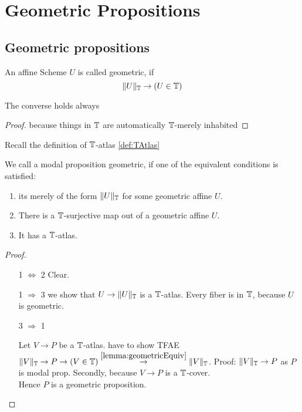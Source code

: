 \section{Geometric Propositions}
\subsection{Geometric propositions}
\begin{definition}
	An affine Scheme $U$ is called geometric, if 
	\[\|U\|_{\mathbb{T}} \to (U \in \mathbb{T})\]	
\end{definition}
\begin{lemma}{\label{lemma:geometricEquiv}}
	The converse holds always
\end{lemma}
\begin{proof}
	because things in $\mathbb{T}$ are automatically $\mathbb{T}$-merely inhabited
\end{proof}
Recall the definition of $\mathbb{T}$-atlas \ref{def:TAtlas}
\begin{definition}{\label{def:algprop}}
	We call a modal proposition geometric, if one of the equivalent conditions is satisfied:
	\begin{enumerate}
		\item  its merely of the form $\|U\|_{\mathbb{T}}$ for some geometric affine $U$.
		\item There is a $\mathbb{T}$-surjective map out of a geometric affine $U$.
		\item It has a $\mathbb{T}$-atlas.
	\end{enumerate}
	
\end{definition}
\begin{proof} \
	\begin{enumerate}
		\item [1 $\Leftrightarrow$ 2]
		Clear.
		\item [1 $\Rightarrow$ 3]
		we show that $U \to \|U\|_{\mathbb{T}}$ is a $\mathbb{T}$-atlas. Every fiber is in $\mathbb{T}$, because $U$ is geometric.
		\item [3 $\Rightarrow$ 1]
		
		Let $V \to P$ be a $\mathbb{T}$-atlas.
		have to show TFAE $\|V\|_{\mathbb{T}} \to P \to (V \in \mathbb{T}) \overset{\ref{lemma:geometricEquiv}}{\to} \|V\|_{\mathbb{T}}$. 
		Proof: $\|V\|_{\mathbb{T}} \to P$ as $P$ is modal prop. Secondly, because $V \to P$ is a $\mathbb{T}$-cover. \\
		Hence $P$ is a geometric proposition.	
	\end{enumerate}
	
\end{proof}

